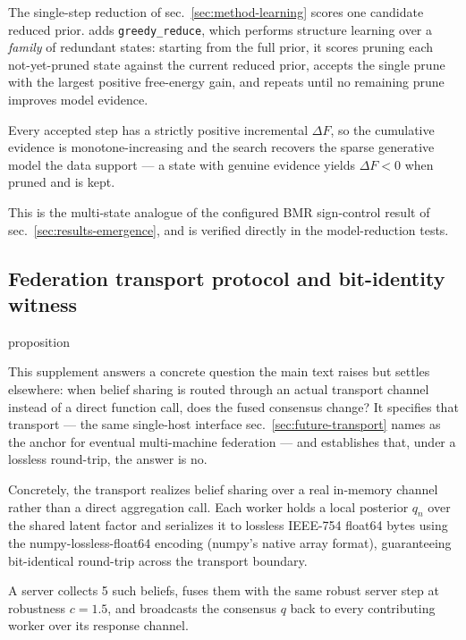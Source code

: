 \documentclass[
  english,
]{article}
\theoremstyle{plain}
\theoremstyle{definition}
\theoremstyle{remark}
\theoremstyle{definition}
\begin{document}
The single-step reduction of sec.~\ref{sec:method-learning} scores one
candidate reduced prior.  adds
\texttt{greedy\_reduce}, which performs structure learning over a
\emph{family} of redundant states: starting from the full prior, it
scores pruning each not-yet-pruned state against the current reduced
prior, accepts the single prune with the largest positive free-energy
gain, and repeats until no remaining prune improves model evidence.

Every accepted step has a strictly positive incremental \(\Delta F\), so
the cumulative evidence is monotone-increasing and the search recovers
the sparse generative model the data support --- a state with genuine
evidence yields \(\Delta F < 0\) when pruned and is kept.

This is the multi-state analogue of the configured BMR sign-control
result of sec.~\ref{sec:results-emergence}, and is verified directly in
the model-reduction tests.

\subsection{Federation transport protocol and bit-identity
witness}\label{sec:supp-federation}

\ifcsname proposition\endcsname
\else
\newtheorem{proposition}{Proposition}
\fi

This supplement answers a concrete question the main text raises but
settles elsewhere: when belief sharing is routed through an actual
transport channel instead of a direct function call, does the fused
consensus change? It specifies that transport --- the same single-host
interface sec.~\ref{sec:future-transport} names as the anchor for
eventual multi-machine federation --- and establishes that, under a
lossless round-trip, the answer is no.

Concretely, the transport realizes belief sharing over a real in-memory
channel rather than a direct aggregation call. Each worker holds a local
posterior \(q_n\) over the shared latent factor and serializes it to
lossless IEEE-754 float64 bytes using the numpy-lossless-float64
encoding (numpy's native array format), guaranteeing bit-identical
round-trip across the transport boundary.

A server collects 5 such beliefs, fuses them with the same robust server
step at robustness \(c = 1.5\), and broadcasts the consensus \(q\) back
to every contributing worker over its response channel.
\end{document}
